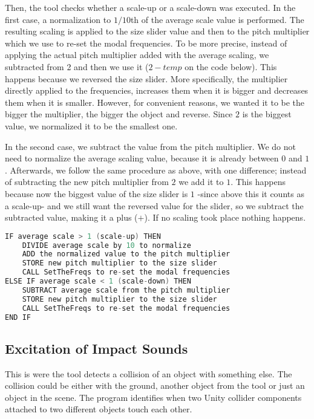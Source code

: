 Then, the tool checks whether a scale-up or a scale-down was executed. In the first case, a normalization to $1/10$th of the average scale value is performed. The resulting scaling is applied to the size slider value and then to the pitch multiplier which we use to re-set the modal frequencies. To be more precise, instead of applying the actual pitch multiplier added with the average scaling, we subtracted from 2 and then we use it ($2-temp$ on the code below). This happens because we reversed the size slider. More specifically, the multiplier directly applied to the frequencies, increases them when it is bigger and decreases them when it is smaller. However, for convenient reasons, we wanted it to be the bigger the multiplier, the bigger the object and reverse. Since $2$ is the biggest value, we normalized it to be the smallest one.

In the second case, we subtract the value from the pitch multiplier. We do not need to normalize the average scaling value, because it is already between $0$ and $1$. Afterwards, we follow the same procedure as above, with one difference; instead of subtracting the new pitch multiplier from $2$ we add it to $1$. This happens because now the biggest value of the size slider is $1$ -since above this it counts as a scale-up- and we still want the reversed value for the slider, so we subtract the subtracted value, making it a plus ($+$). If no scaling took place nothing happens.

\begin{lstlisting}[language=C]
IF average scale > 1 (scale-up) THEN
    DIVIDE average scale by 10 to normalize
    ADD the normalized value to the pitch multiplier
    STORE new pitch multiplier to the size slider
    CALL SetTheFreqs to re-set the modal frequencies
ELSE IF average scale < 1 (scale-down) THEN
    SUBTRACT average scale from the pitch multiplier
    STORE new pitch multiplier to the size slider
    CALL SetTheFreqs to re-set the modal frequencies
END IF
\end{lstlisting}



\subsection{Excitation of Impact Sounds}\label{sec:coll_enter}
This is were the tool detects a collision of an object with something else. The collision could be either with the ground, another object from the tool or just an object in the scene. The program identifies when two Unity\textsuperscript{\textregistered} collider components attached to two different objects touch each other.

